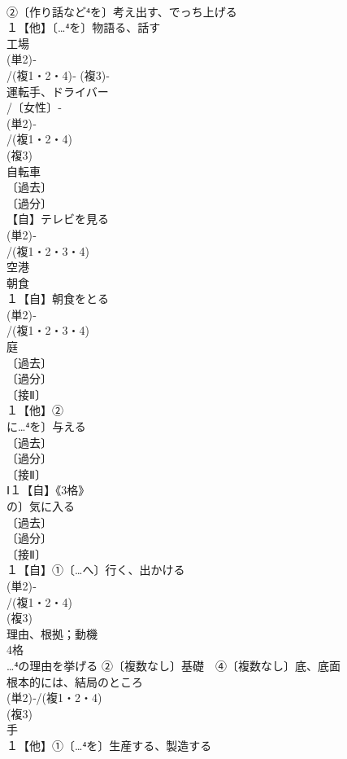 \documentclass[8pt]{extreport}
\begin{document}
\begin{CJK}{UTF8}{min}
\\	②〔作り話など⁴を〕考え出す、でっち上げる
\\	１【他】〔…⁴を〕物語る、話す
\\	工場
\\	(単2)‐
\\	/(複1・2・4)‐ (複3)‐
\\	運転手、ドライバー
\\	/〔女性〕‐
\\	(単2)‐
\\	/(複1・2・4)
\\	(複3)
\\	自転車
\\	〔過去〕
\\	〔過分〕
\\	【自】テレビを見る
\\	(単2)‐
\\	/(複1・2・3・4)
\\	空港
\\	朝食 
\\	１【自】朝食をとる
\\	(単2)‐
\\	/(複1・2・3・4)
\\	庭 
\\	〔過去〕
\\	〔過分〕
\\	〔接Ⅱ〕
\\	１【他】②
\\	に…⁴を〕与える
\\	〔過去〕
\\	〔過分〕
\\	〔接Ⅱ〕
\\	Ⅰ１【自】《3格》
\\	の〕気に入る
\\	〔過去〕
\\	〔過分〕
\\	〔接Ⅱ〕
\\	１【自】①〔…へ〕行く、出かける
\\	(単2)‐
\\	/(複1・2・4)
\\	(複3)
\\	理由、根拠；動機 
\\	4格 
\\	…⁴の理由を挙げる ②〔複数なし〕基礎　④〔複数なし〕底、底面 
\\	根本的には、結局のところ
\\	(単2)‐/(複1・2・4)
\\	(複3)
\\	手
\\	１【他】①〔…⁴を〕生産する、製造する

\end{CJK}
\end{document}
